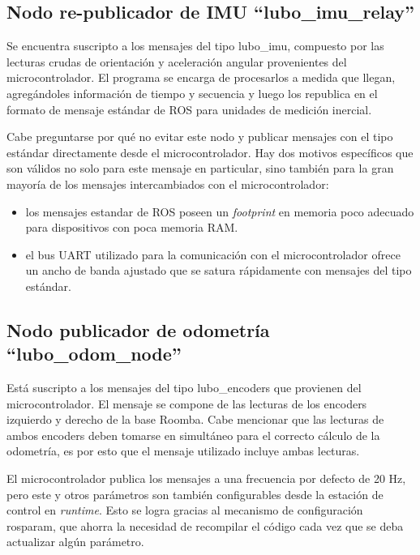 \subsection{Nodo re-publicador de IMU ``lubo\_imu\_relay''}

Se encuentra suscripto a los mensajes del tipo lubo\_imu, compuesto por las lecturas crudas de orientación y aceleración angular provenientes del microcontrolador. El programa se encarga de procesarlos a medida que llegan, agregándoles información de tiempo y secuencia y luego los republica en el formato de mensaje estándar de ROS para unidades de medición inercial\protect\footnotemark.


Cabe preguntarse por qué no evitar este nodo y publicar mensajes con el tipo estándar directamente desde el microcontrolador. Hay dos motivos específicos que son válidos no solo para este mensaje en particular, sino también para la gran mayoría de los mensajes intercambiados con el microcontrolador:
\begin{itemize}
  \item los mensajes estandar de ROS poseen un \textit{footprint} en memoria poco adecuado para dispositivos con poca memoria RAM.
  \item el bus UART utilizado para la comunicación con el microcontrolador ofrece un ancho de banda ajustado que se satura rápidamente con mensajes del tipo estándar.
\end{itemize}


\subsection{Nodo publicador de odometría ``lubo\_odom\_node''}

Está suscripto a los mensajes del tipo lubo\_encoders que provienen del microcontrolador. El mensaje se compone de las lecturas de los encoders izquierdo y derecho de la base Roomba. Cabe mencionar que las lecturas de ambos encoders deben tomarse en simultáneo para el correcto cálculo de la odometría, es por esto que el mensaje utilizado incluye ambas lecturas.

El microcontrolador publica los mensajes a una frecuencia por defecto de 20 Hz, pero este y otros parámetros son también configurables desde la estación de control en \textit{runtime}. Esto se logra gracias al mecanismo de configuración rosparam, que ahorra la necesidad de recompilar el código cada vez que se deba actualizar algún parámetro.

